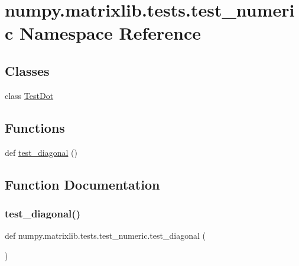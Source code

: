 \hypertarget{namespacenumpy_1_1matrixlib_1_1tests_1_1test__numeric}{}\section{numpy.\+matrixlib.\+tests.\+test\+\_\+numeric Namespace Reference}
\label{namespacenumpy_1_1matrixlib_1_1tests_1_1test__numeric}
\subsection*{Classes}
\begin{DoxyCompactItemize}
\item 
class \hyperlink{classnumpy_1_1matrixlib_1_1tests_1_1test__numeric_1_1TestDot}{Test\+Dot}
\end{DoxyCompactItemize}
\subsection*{Functions}
\begin{DoxyCompactItemize}
\item 
def \hyperlink{namespacenumpy_1_1matrixlib_1_1tests_1_1test__numeric_a070507dfa74016a84284360a7115d1a8}{test\+\_\+diagonal} ()
\end{DoxyCompactItemize}


\subsection{Function Documentation}
\mbox{\label{namespacenumpy_1_1matrixlib_1_1tests_1_1test__numeric_a070507dfa74016a84284360a7115d1a8}} 
\subsubsection{\texorpdfstring{test\+\_\+diagonal()}{test\_diagonal()}}
{\footnotesize\ttfamily def numpy.\+matrixlib.\+tests.\+test\+\_\+numeric.\+test\+\_\+diagonal (\begin{DoxyParamCaption}{ }\end{DoxyParamCaption})}


